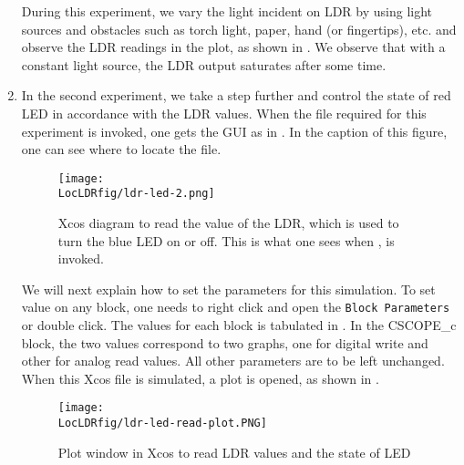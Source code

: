 \begin{enumerate}
  During this experiment, we vary the light incident on LDR by using
   light sources and obstacles such as torch light, paper,
  hand (or fingertips), etc. and observe the LDR readings in the plot, as shown in 
  . We observe that with a constant light source, the LDR output saturates after some time. 


\item In the second experiment, we take a step further and control the
state of red LED in accordance with the LDR values. When the file required for this
  experiment is invoked, one gets the GUI as in .
  In the caption of this figure, one can see where to locate the file.

  \begin{figure}
    \centering
    \texttt{[image: \\LocLDRfig/ldr-led-2.png]}
    \caption[Xcos diagram to read the value of the LDR, which is used
    to turn the blue LED on or off] {Xcos diagram to read the value of
      the LDR, which is used to turn the blue LED on or off.  This is
      what one sees when , is
      invoked.}
    \label{fig:ldr-led}
  \end{figure}

  We will next explain how to set the parameters for this simulation.
  To set value on any block, one needs to right click and open the
  {\tt Block Parameters} or double click.  The values for each block
  is tabulated in .  In the CSCOPE\_c block, the
  two values correspond to two graphs, one for digital write and other
  for analog read values. All other parameters are to be left
  unchanged. When this Xcos file is simulated, a plot is opened, 
  as shown in . 

  \begin{figure}
    \centering
    \texttt{[image: \\LocLDRfig/ldr-led-read-plot.PNG]}
    \caption{Plot window in Xcos to read LDR values and the state of LED}
    \label{fig:ldr-led-read-plot}
  \end{figure}


\end{enumerate}

